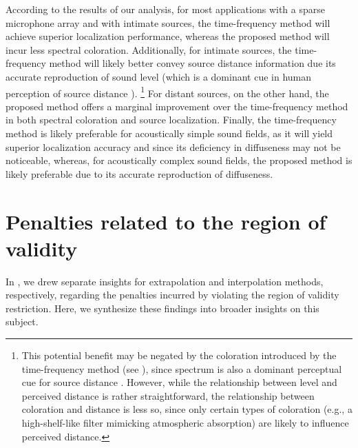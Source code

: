 According to the results of our analysis, for most applications with a sparse microphone array and with intimate sources, the time-frequency method will achieve superior localization performance, whereas the proposed method will incur less spectral coloration.
Additionally, for intimate sources, the time-frequency method will likely better convey source distance information due its accurate reproduction of sound level (which is a dominant cue in human perception of source distance \citep[section 3.1.1]{Zahorik2005}).%
\footnote{This potential benefit may be negated by the coloration introduced by the time-frequency method (see ), since spectrum is also a dominant perceptual cue for source distance \citep[section 3.1.3]{Zahorik2005}.
However, while the relationship between level and perceived distance is rather straightforward, the relationship between coloration and distance is less so, since only certain types of coloration (e.g., a high-shelf-like filter mimicking atmospheric absorption) are likely to influence perceived distance.}
For distant sources, on the other hand, the proposed method offers a marginal improvement over the time-frequency method in both spectral coloration and source localization.
Finally, the time-frequency method is likely preferable for acoustically simple sound fields, as it will yield superior localization accuracy and since its deficiency in diffuseness may not be noticeable, whereas, for acoustically complex sound fields, the proposed method is likely preferable due to its accurate reproduction of diffuseness.

\section{Penalties related to the region of validity}

In , we drew separate insights for extrapolation and interpolation methods, respectively, regarding the penalties incurred by violating the region of validity restriction.
Here, we synthesize these findings into broader insights on this subject.


